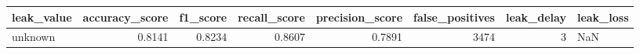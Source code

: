 \begin{tabular}{lrrrrrrl}
\toprule
leak\_value & accuracy\_score & f1\_score & recall\_score & precision\_score & false\_positives & leak\_delay & leak\_loss \\
\midrule
unknown & 0.8141 & 0.8234 & 0.8607 & 0.7891 & 3474 & 3 & NaN \\
\bottomrule
\end{tabular}
